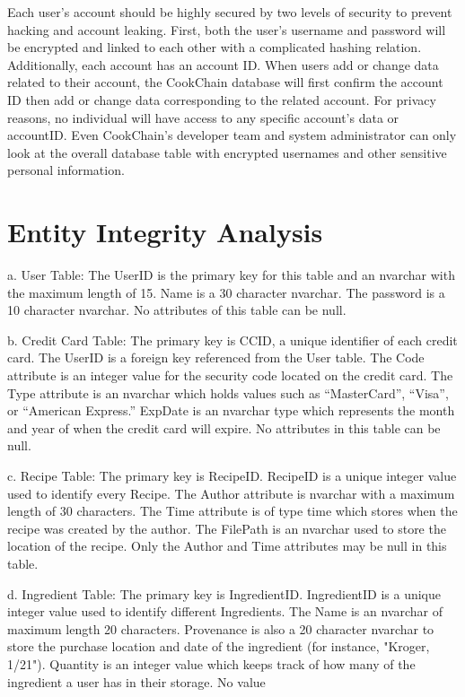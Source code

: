 \documentclass{article}
\begin{document}
Each user's account should be highly secured by two levels of security to prevent hacking and account leaking. First, both the user's username and password will be encrypted and linked to each other with a complicated hashing relation. Additionally, each account has an account ID. When users add or change data related to their account, the CookChain database will first confirm the account ID then add or change data corresponding to the related account. For privacy reasons, no individual will have access to any specific account's data or accountID. Even CookChain's developer team and system administrator can only look at the overall database table with encrypted usernames and other sensitive personal information.
\section{Entity Integrity Analysis}
a.	User Table: The UserID is the primary key for this table and an nvarchar with the maximum length of 15. Name is a 30 character nvarchar. The password is a 10 character nvarchar. No attributes of this table can be null.
 
b.	Credit Card Table: The primary key is CCID, a unique identifier of each credit card. The UserID is a foreign key referenced from the User table. The Code attribute is an integer value for the security code located on the credit card. The Type attribute is an nvarchar which holds values such as “MasterCard”, “Visa”, or “American Express.” ExpDate is an nvarchar type which represents the month and year of when the credit card will expire. No attributes in this table can be null.

c.	Recipe Table: The primary key is RecipeID. RecipeID is a unique integer value used to identify every Recipe. The Author attribute is nvarchar with a maximum length of 30 characters. The Time attribute is of type time which stores when the recipe was created by the author. The FilePath is an nvarchar used to store the location of the recipe. Only the Author and Time attributes may be null in this table.

d.	Ingredient Table: The primary key is IngredientID. IngredientID is a unique integer value used to identify different Ingredients. The Name is an nvarchar of maximum length 20 characters. Provenance is also a 20 character nvarchar to store the purchase location and date of the ingredient (for instance, "Kroger, 1/21"). Quantity is an integer value which keeps track of how many of the ingredient a user has in their storage. No value
\end{document}
